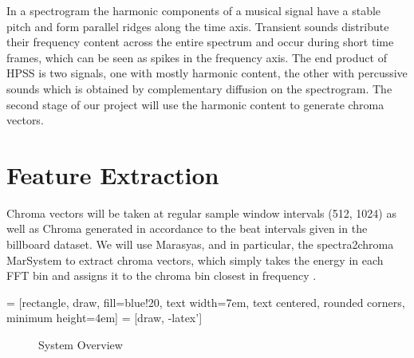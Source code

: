 \documentclass{article}
\begin{document}
In a spectrogram the harmonic components of a musical signal have a stable
pitch and form parallel ridges along the time axis. Transient sounds distribute
their frequency content across the entire spectrum and occur during short time
frames, which can be seen as spikes in the frequency axis. The end product of
HPSS is two signals, one with mostly harmonic content, the other with
percussive sounds which is obtained by complementary diffusion on the
spectrogram. The second stage of our project will use the harmonic content to
generate chroma vectors.\newline

\section{Feature Extraction}

Chroma vectors will be taken at regular sample window intervals (512, 1024) as well as Chroma generated in accordance to the beat intervals given in the billboard dataset.  We will use Marasyas, and in particular, the spectra2chroma MarSystem to extract chroma vectors, which simply takes the energy in each FFT bin and assigns it to the chroma bin closest in frequency . \newline

 = [rectangle, draw, fill=blue!20,
    text width=7em, text centered, rounded corners, minimum height=4em]
 = [draw, -latex']

\begin{figure}
\caption{System Overview}
\end{figure}
\end{document}
